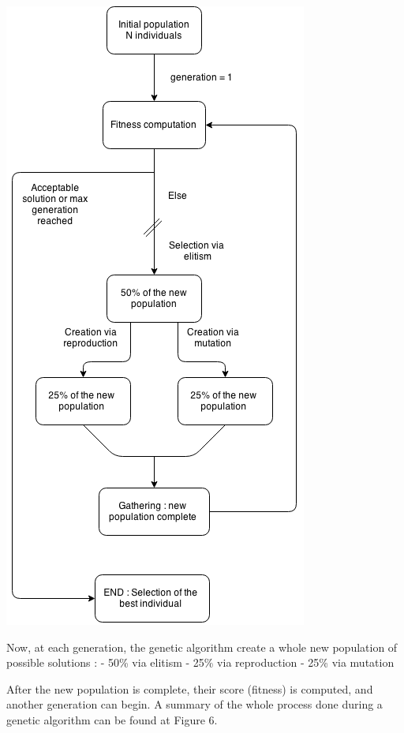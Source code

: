 \documentclass{report}
\begin{document}
		\vspace{0.5cm}
		\begin{center}
			\includegraphics[scale=0.5]{ressources/ag3}	
		\end{center}
		\vspace{1cm}
		
		Now, at each generation, the genetic algorithm create a whole new population of possible solutions :
		- 50\% via elitism
		- 25\% via reproduction
		- 25\% via mutation
		
		After the new population is complete, their score (fitness) is computed, and another generation can begin. A summary of the whole process done during a genetic algorithm can be found at Figure 6.
		
\end{document}

